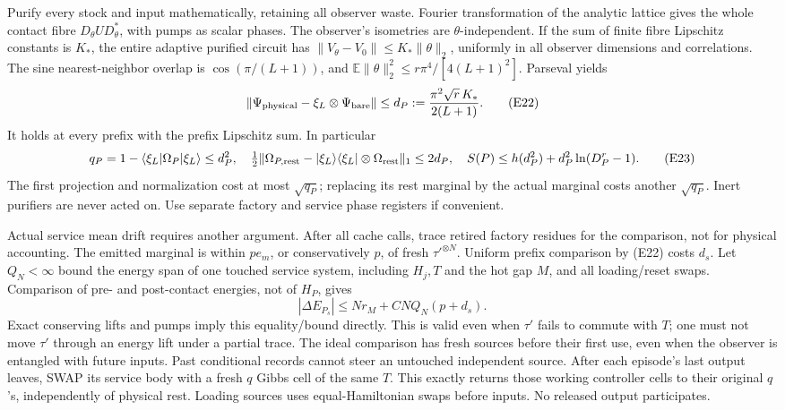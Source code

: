 Purify every stock and input mathematically, retaining all observer
waste. Fourier transformation of the analytic lattice gives the
whole contact fibre \(D_\theta U D_\theta^*\), with pumps as scalar
phases. The observer's isometries are \(\theta\)-independent.
If the sum of finite fibre Lipschitz constants is \(K_*\), the entire
adaptive purified circuit has
\(\|V_\theta-V_0\|\le K_*\|\theta\|_2\), uniformly in all observer
dimensions and correlations. The sine nearest-neighbor overlap is
\(\cos(\pi/(L+1))\), and
\(\mathbb E\|\theta\|_2^2\le r\pi^4/[4(L+1)^2]\).
Parseval yields
\[
 \|\Psi_{\rm physical}-\xi_L\otimes\Psi_{\rm bare}\|
 \le d_P:=\frac{\pi^2\sqrt r\,K_*}{2(L+1)}.           \tag{E22}
\]
It holds at every prefix with the prefix Lipschitz sum.
In particular
\[
 q_P=1-\langle\xi_L|\Omega_P|\xi_L\rangle\le d_P^2,\quad
 \tfrac12\|\Omega_{P,\rm rest}-|\xi_L\rangle\langle\xi_L|
                          \otimes\Omega_{\rm rest}\|_1\le2d_P,
 \quad S(P)\le h(d_P^2)+d_P^2\ln(D_P^r-1).           \tag{E23}
\]
The first projection and normalization cost at most \(\sqrt{q_P}\);
replacing its rest marginal by the actual marginal costs another
\(\sqrt{q_P}\). Inert purifiers are never acted on.
Use separate factory and service phase registers if convenient.

Actual service mean drift requires another argument.
After all cache calls, trace retired factory residues for the
comparison, not for physical accounting. The emitted marginal is
within \(pe_m\), or conservatively \(p\), of fresh \(\tau'^{\otimes N}\).
Uniform prefix comparison by (E22) costs \(d_s\).
Let \(Q_N<\infty\) bound the energy span of one touched service system,
including \(H_j,T\) and the hot gap \(M\), and all loading/reset swaps.
Comparison of pre- and post-contact energies, not of \(H_P\), gives
\[
 |\Delta E_{P_s}|\le N r_M+C NQ_N(p+d_s).             \tag{E24}
\]
Exact conserving lifts and pumps imply this equality/bound directly.
This is valid even when \(\tau'\) fails to commute with \(T\);
one must not move \(\tau'\) through an energy lift under a partial trace.
The ideal comparison has fresh sources before their first use, even
when the observer is entangled with future inputs. Past conditional
records cannot steer an untouched independent source.
After each episode's last output leaves, SWAP its service body with
a fresh \(q\) Gibbs cell of the same \(T\). This exactly returns those
working controller cells to their original \(q\)'s, independently
of physical rest. Loading sources uses equal-Hamiltonian swaps before inputs.
No released output participates.


